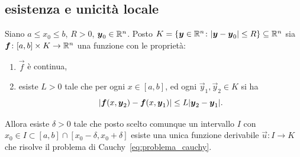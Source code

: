 \subsection{esistenza e unicità locale}

\begin{theorem}%
  \label{th:cauchy_lipschitz}%
Siano $a\le x_0 \le b$, $R>0$, $\boldsymbol y_0 \in {\mathbb R}^n$. 
Posto $K={\left\{ \boldsymbol y\in {\mathbb R}^n \colon {\left|\boldsymbol y - \boldsymbol y_0\right|}\le R \right\}}\subseteq {\mathbb R}^n$ 
sia $\boldsymbol f\colon [a,b]\times K\to {\mathbb R}^n$ una funzione con le proprietà:
\begin{enumerate}
  \item $\vec f$ è continua,
  \item esiste $L>0$ tale che per ogni $x\in [a,b]$, ed ogni $\vec y_1,\vec y_2 \in K$ 
  si ha 
  \begin{equation}\label{eq:hp_lipschitz}
  {\left|\boldsymbol f(x, \boldsymbol y_2) - \boldsymbol f(x,\boldsymbol y_1)\right|} \le L {\left|\boldsymbol y_2- \boldsymbol y_1\right|}.  
  \end{equation}
\end{enumerate}

Allora esiste $\delta>0$ tale che posto 
scelto comunque un intervallo $I$ con 
$x_0 \in I \subset [a,b]\cap [x_0-\delta, x_0+\delta]$ 
esiste una unica funzione derivabile $\vec u\colon I \to K$ 
che risolve il problema di Cauchy~\eqref{eq:problema_cauchy}.
\end{theorem}
%
